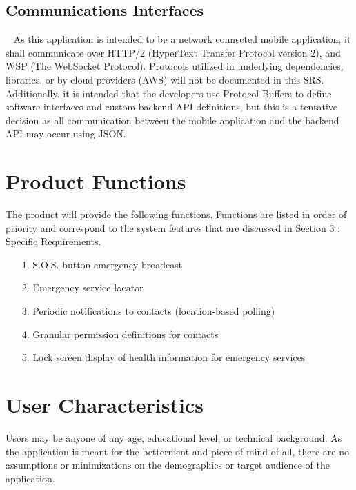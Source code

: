 \documentclass{scrreprt}
\begin{document}
\subsection{Communications Interfaces}
\par ~ As this application is intended to be a network connected mobile application, it shall communicate over HTTP/2 (HyperText Transfer Protocol version 2), and WSP (The WebSocket Protocol). Protocols utilized in underlying dependencies, libraries, or by cloud providers (AWS) will not be documented in this SRS. Additionally, it is intended that the developers use Protocol Buffers to define software interfaces and custom backend API definitions, but this is a tentative decision as all communication between the mobile application and the backend API may occur using JSON.


\section{Product Functions}
The product will provide the following functions. Functions are listed in order of priority and correspond to the system features that are discussed in Section 3 : Specific Requirements. \begin{enumerate}
	\item[1.] S.O.S. button emergency broadcast
	\item[2.] Emergency service locator
	\item[3.] Periodic notifications to contacts (location-based polling)
	\item[4.] Granular permission definitions for contacts
	\item[5.] Lock screen display of health information for emergency services
\end{enumerate}


\section{User Characteristics}
Users may be anyone of any age, educational level, or technical background. As the application is meant for the betterment and piece of mind of all, there are no assumptions or minimizations on the demographics or target audience of the application.
\end{document}
